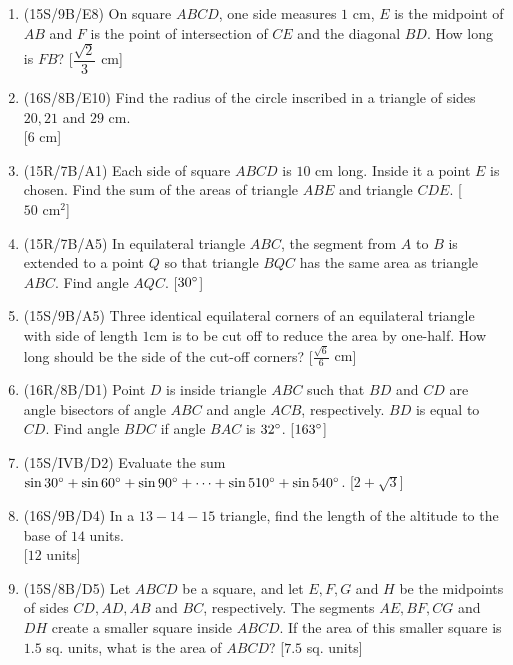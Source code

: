 \documentclass[11pt,paper=letter]{scrartcl}
\begin{document}
\begin{enumerate}

\item (15S/9B/E8) On square $ABCD$, one side measures $1 \text{ cm}$, $E$ is the midpoint of $AB$ and $F$ is the point of intersection of $CE$ and the diagonal $BD$. How long is $FB$? \hfill [$\dfrac{\sqrt{2}}{3} \text{ cm}$]

\item (16S/8B/E10) Find the radius of the circle inscribed in a triangle of sides $20, 21$ and $29 \text{ cm}$. \\ \phantom{.} \hfill [$6 \text{ cm}$]

\item (15R/7B/A1) Each side of square $ABCD$ is $10 \text{ cm}$ long. Inside it a point $E$ is chosen. Find the sum of the areas of triangle $ABE$ and triangle $CDE$. \hfill [$50 \text{ cm}^2$]

\item (15R/7B/A5) In equilateral triangle $ABC$, the segment from $A$ to $B$ is extended to a point $Q$ so that triangle $BQC$ has the same area as triangle $ABC$. Find angle $AQC$. \hfill [$30^\circ$]

\item (15S/9B/A5) Three identical equilateral corners of an equilateral triangle with side of length $1 \text{cm}$ is to be cut off to reduce the area by one-half. How long should be the side of the cut-off corners? \hfill [$\frac{\sqrt{6}}{6} \text{ cm}$]

\item (16R/8B/D1) Point $D$ is inside triangle $ABC$ such that $BD$ and $CD$ are angle bisectors of angle $ABC$ and angle $ACB$, respectively. $BD$ is equal to $CD$. Find angle $BDC$ if angle $BAC$ is $32^\circ$. \hfill [$163^\circ$]

\item (15S/IVB/D2) Evaluate the sum $\sin{30^\circ} + \sin{60^\circ} + \sin{90^\circ} + \cdots + \sin{510^\circ} + \sin{540^\circ}$. \hfill [$2 + \sqrt{3}$]

\item (16S/9B/D4) In a $13-14-15$ triangle, find the length of the altitude to the base of $14$ units. \\ \phantom{.} \hfill [$12$ units]

\item (15S/8B/D5) Let $ABCD$ be a square, and let $E , F , G$ and $H$ be the midpoints of sides $CD , AD , AB$ and $BC$, respectively. The segments $AE , BF , CG$ and $DH$ create a smaller square inside $ABCD$. If the area of this smaller square is $1.5$ sq. units, what is the area of $ABCD$? \hfill [$7.5$ sq. units]


\end{enumerate}
\end{document}
